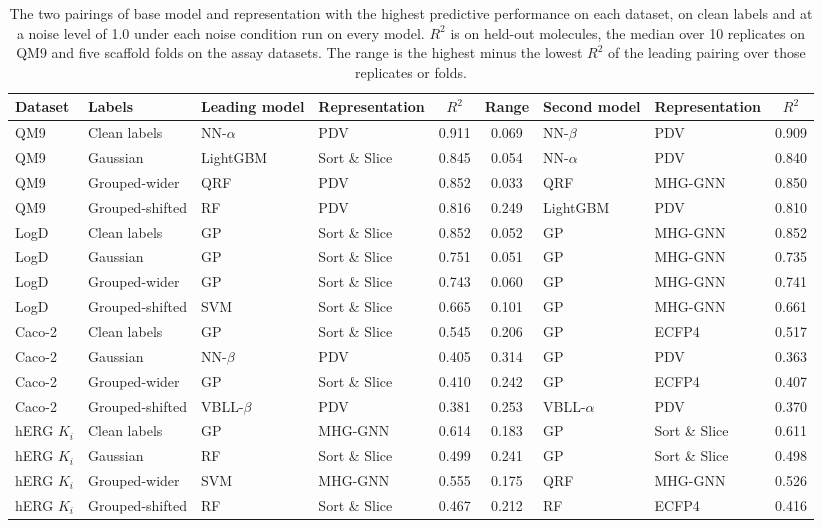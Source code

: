 \begin{table}[!htbp]
\centering
\small
\begin{adjustbox}{max width=\textwidth,max totalheight=0.78\textheight}
\begin{tabular}{llllccllc}
\toprule
Dataset & Labels & Leading model & Representation & $R^2$ & Range & Second model & Representation & $R^2$ \\
\midrule
QM9 & Clean labels & NN-$\alpha$ & PDV & 0.911 & 0.069 & NN-$\beta$ & PDV & 0.909 \\
QM9 & Gaussian & LightGBM & Sort \& Slice & 0.845 & 0.054 & NN-$\alpha$ & PDV & 0.840 \\
QM9 & Grouped-wider & QRF & PDV & 0.852 & 0.033 & QRF & MHG-GNN & 0.850 \\
QM9 & Grouped-shifted & RF & PDV & 0.816 & 0.249 & LightGBM & PDV & 0.810 \\
LogD & Clean labels & GP & Sort \& Slice & 0.852 & 0.052 & GP & MHG-GNN & 0.852 \\
LogD & Gaussian & GP & Sort \& Slice & 0.751 & 0.051 & GP & MHG-GNN & 0.735 \\
LogD & Grouped-wider & GP & Sort \& Slice & 0.743 & 0.060 & GP & MHG-GNN & 0.741 \\
LogD & Grouped-shifted & SVM & Sort \& Slice & 0.665 & 0.101 & GP & MHG-GNN & 0.661 \\
Caco-2 & Clean labels & GP & Sort \& Slice & 0.545 & 0.206 & GP & ECFP4 & 0.517 \\
Caco-2 & Gaussian & NN-$\beta$ & PDV & 0.405 & 0.314 & GP & PDV & 0.363 \\
Caco-2 & Grouped-wider & GP & Sort \& Slice & 0.410 & 0.242 & GP & ECFP4 & 0.407 \\
Caco-2 & Grouped-shifted & VBLL-$\beta$ & PDV & 0.381 & 0.253 & VBLL-$\alpha$ & PDV & 0.370 \\
hERG $K_i$ & Clean labels & GP & MHG-GNN & 0.614 & 0.183 & GP & Sort \& Slice & 0.611 \\
hERG $K_i$ & Gaussian & RF & Sort \& Slice & 0.499 & 0.241 & GP & Sort \& Slice & 0.498 \\
hERG $K_i$ & Grouped-wider & SVM & MHG-GNN & 0.555 & 0.175 & QRF & MHG-GNN & 0.526 \\
hERG $K_i$ & Grouped-shifted & RF & Sort \& Slice & 0.467 & 0.212 & RF & ECFP4 & 0.416 \\
\bottomrule
\end{tabular}
\end{adjustbox}
\caption[Leading pairings of model and representation on each dataset.]{The two pairings of base model and representation with the highest predictive performance on each dataset, on clean labels and at a noise level of 1.0 under each noise condition run on every model. $R^2$ is on held-out molecules, the median over 10 replicates on QM9 and five scaffold folds on the assay datasets. The range is the highest minus the lowest $R^2$ of the leading pairing over those replicates or folds.}
\label{tab:leaders}
\end{table}

